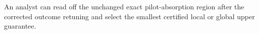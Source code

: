 An analyst can read off the unchanged exact pilot-absorption region after the corrected outcome retuning and select the smallest certified local or global upper guarantee.